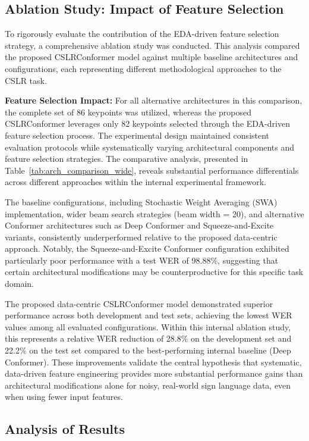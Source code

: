 \subsection{Ablation Study: Impact of Feature Selection}
To rigorously evaluate the contribution of the EDA-driven feature selection strategy, a comprehensive ablation study was conducted. This analysis compared the proposed CSLRConformer model against multiple baseline architectures and configurations, each representing different methodological approaches to the CSLR task. 

\textbf{Feature Selection Impact:} For all alternative architectures in this comparison, the complete set of 86 keypoints was utilized, whereas the proposed CSLRConformer leverages only 82 keypoints selected through the EDA-driven feature selection process. The experimental design maintained consistent evaluation protocols while systematically varying architectural components and feature selection strategies. The comparative analysis, presented in Table~\ref{tab:arch_comparison_wide}, reveals substantial performance differentials across different approaches within the internal experimental framework.

The baseline configurations, including Stochastic Weight Averaging (SWA) implementation, wider beam search strategies (beam width = 20), and alternative Conformer architectures such as Deep Conformer and Squeeze-and-Excite variants, consistently underperformed relative to the proposed data-centric approach. Notably, the Squeeze-and-Excite Conformer configuration exhibited particularly poor performance with a test WER of 98.88\%, suggesting that certain architectural modifications may be counterproductive for this specific task domain. 

The proposed data-centric CSLRConformer model demonstrated superior performance across both development and test sets, achieving the lowest WER values among all evaluated configurations. Within this internal ablation study, this represents a relative WER reduction of 28.8\% on the development set and 22.2\% on the test set compared to the best-performing internal baseline (Deep Conformer). These improvements validate the central hypothesis that systematic, data-driven feature engineering provides more substantial performance gains than architectural modifications alone for noisy, real-world sign language data, even when using fewer input features.

\subsection{Analysis of Results}

